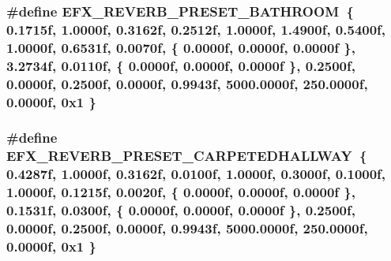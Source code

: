 \subsubsection[{\texorpdfstring{E\+F\+X\+\_\+\+R\+E\+V\+E\+R\+B\+\_\+\+P\+R\+E\+S\+E\+T\+\_\+\+B\+A\+T\+H\+R\+O\+OM}{EFX_REVERB_PRESET_BATHROOM}}]{\setlength{\rightskip}{0pt plus 5cm}\#define E\+F\+X\+\_\+\+R\+E\+V\+E\+R\+B\+\_\+\+P\+R\+E\+S\+E\+T\+\_\+\+B\+A\+T\+H\+R\+O\+OM~\{ 0.\+1715f, 1.\+0000f, 0.\+3162f, 0.\+2512f, 1.\+0000f, 1.\+4900f, 0.\+5400f, 1.\+0000f, 0.\+6531f, 0.\+0070f, \{ 0.\+0000f, 0.\+0000f, 0.\+0000f \}, 3.\+2734f, 0.\+0110f, \{ 0.\+0000f, 0.\+0000f, 0.\+0000f \}, 0.\+2500f, 0.\+0000f, 0.\+2500f, 0.\+0000f, 0.\+9943f, 5000.\+0000f, 250.\+0000f, 0.\+0000f, 0x1 \}}\hypertarget{efx-presets_8h_a9a6ed45db903abdc2855254f72c89897}{}\label{efx-presets_8h_a9a6ed45db903abdc2855254f72c89897}
\subsubsection[{\texorpdfstring{E\+F\+X\+\_\+\+R\+E\+V\+E\+R\+B\+\_\+\+P\+R\+E\+S\+E\+T\+\_\+\+C\+A\+R\+P\+E\+T\+E\+D\+H\+A\+L\+L\+W\+AY}{EFX_REVERB_PRESET_CARPETEDHALLWAY}}]{\setlength{\rightskip}{0pt plus 5cm}\#define E\+F\+X\+\_\+\+R\+E\+V\+E\+R\+B\+\_\+\+P\+R\+E\+S\+E\+T\+\_\+\+C\+A\+R\+P\+E\+T\+E\+D\+H\+A\+L\+L\+W\+AY~\{ 0.\+4287f, 1.\+0000f, 0.\+3162f, 0.\+0100f, 1.\+0000f, 0.\+3000f, 0.\+1000f, 1.\+0000f, 0.\+1215f, 0.\+0020f, \{ 0.\+0000f, 0.\+0000f, 0.\+0000f \}, 0.\+1531f, 0.\+0300f, \{ 0.\+0000f, 0.\+0000f, 0.\+0000f \}, 0.\+2500f, 0.\+0000f, 0.\+2500f, 0.\+0000f, 0.\+9943f, 5000.\+0000f, 250.\+0000f, 0.\+0000f, 0x1 \}}\hypertarget{efx-presets_8h_a178ed1682d59effcaa37ee1bb6ee69c1}{}\label{efx-presets_8h_a178ed1682d59effcaa37ee1bb6ee69c1}
